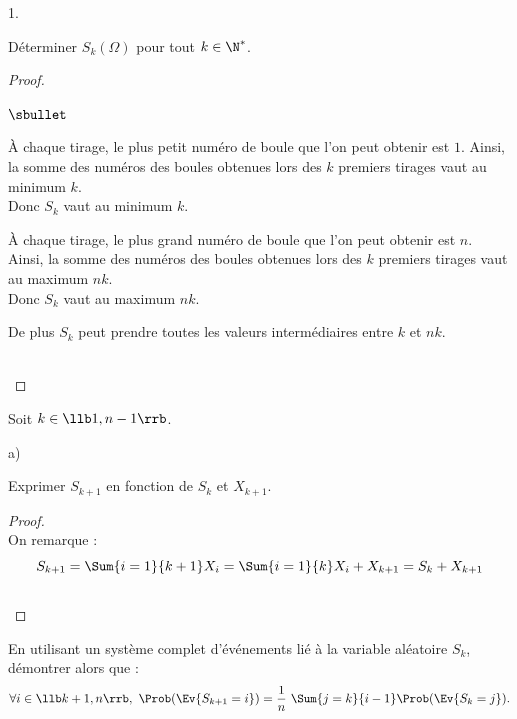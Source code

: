 \documentclass[11pt]{article}%
\begin{document}
\begin{noliste}{1.}
  \setcounter{enumi}{4}
\item Déterminer $S_k(\Omega)$ pour tout $k\in\N^*$.
  
  \begin{proof}~
    \begin{noliste}{$\sbullet$}
    \item À chaque tirage, le plus petit numéro de boule que l'on peut
      obtenir est $1$. Ainsi, la somme des numéros des boules
      obtenues lors des $k$ premiers tirages vaut au minimum
      $k$.\\[.2cm] 
      Donc $S_k$ vaut au minimum $k$.
    \item À chaque tirage, le plus grand numéro de boule que l'on peut
      obtenir est $n$. Ainsi, la somme des numéros des boules
      obtenues lors des $k$ premiers tirages vaut au maximum
      $nk$.\\[.2cm] 
      Donc $S_k$ vaut au maximum $nk$.
    \item De plus $S_k$ peut prendre toutes les valeurs intermédiaires
      entre $k$ et $nk$.
    \end{noliste}
    ~\\[-1.4cm]
  \end{proof}




\item Soit $k\in\llb 1,n-1\rrb$.
  \begin{noliste}{a)}
  \item Exprimer $S_{k+1}$ en fonction de $S_k$ et $X_{k+1}$.
    
    \begin{proof}~\\
      On remarque :
      \[
      S_{k+1}=\Sum{i=1}{k+1} X_i = \Sum{i=1}{k} X_i + X_{k+1} = 
      S_k+X_{k+1}
      \]
      ~\\[-1cm]
    \end{proof}
    
  \item En utilisant un système complet d'événements lié à la
    variable aléatoire $S_k$, démontrer alors que :
    \[
    \forall i \in\llb k+1,n\rrb, \ \Prob(\Ev{S_{k+1}=i}) =
    \dfrac{1}{n} \ \Sum{j=k}{i-1} \Prob(\Ev{S_k=j}).
    \]
    

\end{noliste}
\end{noliste}
\end{document}
